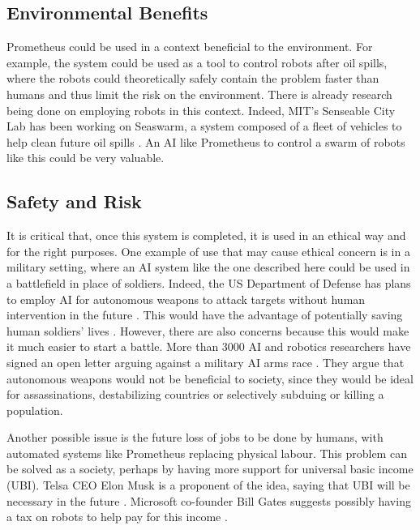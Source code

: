 \documentclass[titlepage,11pt]{article}
\begin{document}
\subsection{Environmental Benefits}

Prometheus could be used in a context beneficial to the environment. For example, the system could be used as a tool to control robots after oil spills, where the robots could theoretically safely contain the problem faster than humans and thus limit the risk on the environment. There is already research being done on employing robots in this context. Indeed, MIT's Senseable City Lab has been working on Seaswarm, a system composed of a fleet of vehicles to help clean future oil spills \cite{seaswarm}. An AI like Prometheus to control a swarm of robots like this could be very valuable. 

\subsection{Safety and Risk}

It is critical that, once this system is completed, it is used in an ethical way and for the right purposes. One example of use that may cause ethical concern is in a military setting, where an AI system like the one described here could be used in a battlefield in place of soldiers. Indeed, the US Department of Defense has plans to employ AI for autonomous weapons to attack targets without human intervention in the future \cite{military}. This would have the advantage of potentially saving human soldiers' lives \cite{define_military_ai}. However, there are also concerns because this would make it much easier to start a battle. More than 3000 AI and robotics researchers have signed an open letter arguing against a military AI arms race \cite{openletter}. They argue that autonomous weapons would not be beneficial to society, since they would be ideal for assassinations, destabilizing countries or selectively subduing or killing a population.

Another possible issue is the future loss of jobs to be done by humans, with automated systems like Prometheus replacing physical labour. This problem can be solved as a society, perhaps by having more support for universal basic income (UBI). Telsa CEO Elon Musk is a proponent of the idea, saying that UBI will be necessary in the future \cite{musk}. Microsoft co-founder Bill Gates suggests possibly having a tax on robots to help pay for this income \cite{gates}.
\end{document}
